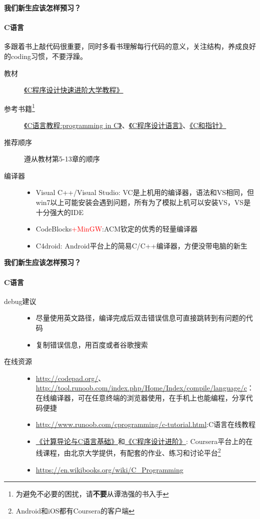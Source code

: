 \documentclass[xcolor={usenames,dvipsnames}]{beamer}
\begin{document}
\begin{frame}{\textbf{我们新生应该怎样预习？}}
  \framesubtitle{C语言}
  \begin{block}{}
  多跟着书上敲代码很重要，同时多看书理解每行代码的意义，关注结构，养成良好的coding习惯，不要浮躁。
  \end{block}
  \begin{description}
    \item[教材] \href{http://opac.lib.dlut.edu.cn/opac/item.php?marc_no=2010028166}{《C程序设计快速进阶大学教程》}
    \item[参考书籍\footnote{为避免不必要的困扰，请\textbf{不要}从谭浩强的书入手}] \href{http://opac.lib.dlut.edu.cn/opac/item.php?marc_no=2007039426}{《C语言教程:programming in C》}、\href{http://opac.lib.dlut.edu.cn/opac/item.php?marc_no=2003046536}{《C程序设计语言》}、\href{http://opac.lib.dlut.edu.cn/opac/item.php?marc_no=2008007312}{《C和指针》} 
    \item[推荐顺序] 遵从教材第5-13章的顺序 
    \item[编译器] 
    \begin{itemize}
     \item Visual C++/Visual Studio: VC是上机用的编译器，语法和VS相同，但win7以上可能安装会遇到问题，所有为了模拟上机可以安装VS，VS是十分强大的IDE
     \item CodeBlocks\textcolor{red}{+MinGW}:ACM钦定的优秀的轻量编译器
     \item C4droid: Android平台上的简易C/C++编译器，方便没带电脑的新生
    \end{itemize}
  \end{description}
\end{frame}

\begin{frame}{\textbf{我们新生应该怎样预习？}}
\framesubtitle{C语言}
\begin{description}
    \item[debug建议]
    \begin{itemize}
    \item 尽量使用英文路径，编译完成后双击错误信息可直接跳转到有问题的代码
    \item 复制错误信息，用百度或者谷歌搜索
    \end{itemize}
    \item[在线资源] \begin{itemize}
    \item \url{http://codepad.org/}、\url{http://tool.runoob.com/index.php/Home/Index/compile/language/c}：在线编译器，可在任意终端的浏览器使用，在手机上也能编程，分享代码便捷
    \item \url{http://www.runoob.com/cprogramming/c-tutorial.html}:C语言在线教程
    \item \href{https://www.coursera.org/learn/jisuanji-biancheng}{《计算导论与C语言基础》}和\href{https://www.coursera.org/learn/c-chengxu-sheji}{《C程序设计进阶》}: Coursera平台上的在线课程，由北京大学提供，有配套的作业、练习和讨论平台\footnote{Android和iOS都有Coursera的客户端}
    \item \url{https://en.wikibooks.org/wiki/C_Programming}
    \end{itemize}
\end{description}
\end{frame}
\end{document}
